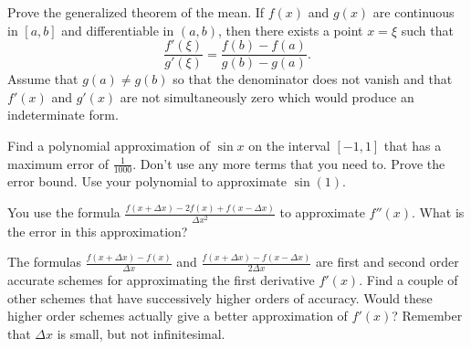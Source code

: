 \begin{Exercise}
  \label{exercise generalized theorem of the mean}
  Prove the generalized theorem of the mean.  
  If $f(x)$ and $g(x)$ are continuous in $[a,b]$ and differentiable in $(a,b)$,
  then there exists a point $x = \xi$ such that
  \[
  \frac{f'(\xi)}{g'(\xi)} = \frac{f(b) - f(a)}{g(b) - g(a)}.
  \]
  Assume that $g(a) \neq g(b)$ so that the denominator does not
  vanish and that $f'(x)$ and $g'(x)$ are not simultaneously zero which
  would produce an indeterminate form.  

\end{Exercise}


\begin{Exercise}
  \label{exercise polynomial approximation sin x}
  Find a polynomial approximation of $\sin x$ on the interval $[-1,1]$ that
  has a maximum error of $\frac{1}{1000}$.  Don't use any more terms that you
  need to.  Prove the error bound.  Use your polynomial to approximate
  $\sin(1)$.

\end{Exercise}






\begin{Exercise}
  \label{exercise second difference centered}
  You use the formula $\frac{f(x+\Delta x)-2f(x)+f(x-\Delta x)}{\Delta x^2}$
  to approximate $f''(x)$.  What is the error in this approximation?

\end{Exercise}



\begin{Exercise}
  \label{exercise first derivative higher}
  The formulas $\frac{f(x + \Delta x) - f(x)}{\Delta x}$ and
  $\frac{f(x + \Delta x) - f(x - \Delta x)}{2 \Delta x}$ are first and
  second order accurate schemes for approximating the first derivative
  $f'(x)$. Find a couple of other schemes that have successively higher orders
  of accuracy.  Would these higher order schemes actually give a better
  approximation of $f'(x)$?  Remember that $\Delta x$ is small, but not
  infinitesimal.

\end{Exercise}



